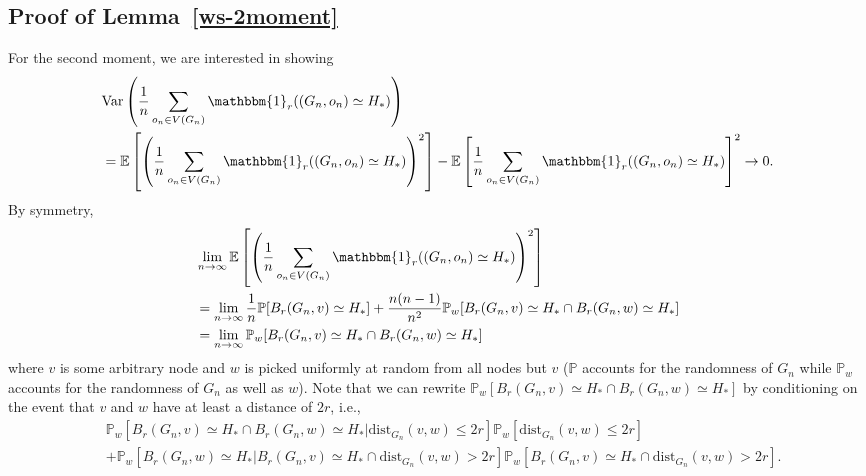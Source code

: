 \documentclass[10pt]{amsart}
\begin{document}
\subsection*{Proof of Lemma~\ref{ws-2moment}} \label{secondmoment} 

For the second moment, we are interested in showing
\begin{equation} \label{goal2}
\begin{split}
&\text{Var}\left(\frac{1}{n} \sum_{o_n\in V(G_n)}  \mathbbm{1}_r((G_n,o_n)\simeq H_* )  \right) \\ &=\mathbb{E}\left[\left(\frac{1}{n} \sum_{o_n\in V(G_n)}  \mathbbm{1}_r((G_n,o_n)\simeq H_* ) \right)^2 \right] - \mathbb{E}\left[\frac{1}{n} \sum_{o_n\in V(G_n)}  \mathbbm{1}_r((G_n,o_n)\simeq H_* )  \right]^2 \to 0.
\end{split}
\end{equation}
By symmetry,
\begin{equation} \label{eq-prob}
\begin{split}
   &\lim_{n \to \infty} \mathbb{E}\left[\left(\frac{1}{n} \sum_{o_n\in V(G_n)}  \mathbbm{1}_r((G_n,o_n)\simeq H_* ) \right)^2 \right] \\ &= \lim_{n \to \infty} \frac{1}{n} \mathbb{P}[B_r(G_n, v) \simeq H_*] + \frac{n(n-1)}{n^2} \mathbb{P}_w[B_r(G_n, v) \simeq H_* \cap B_r(G_n, w) \simeq H_*] \\
    &= \lim_{n \to \infty} \mathbb{P}_w[B_r(G_n, v) \simeq H_* \cap B_r(G_n, w) \simeq H_*]
\end{split}
\end{equation}
where $v$ is some arbitrary node and $w$ is picked uniformly at random from all nodes but $v$ ($\mathbb{P}$ accounts for the randomness of $G_n$ while $\mathbb{P}_w$ accounts for the randomness of $G_n$ as well as $w$). Note that we can rewrite $\mathbb{P}_w[B_r(G_n, v) \simeq H_* \cap B_r(G_n, w) \simeq H_*]$ by conditioning on the event that $v$ and $w$ have at least a distance of $2r$, i.e.,
\begin{equation}
\begin{split} \label{prob-partition}
    &\mathbb{P}_w[B_r(G_n, v) \simeq H_* \cap B_r(G_n, w) \simeq H_* | \text{dist}_{G_n}(v, w) \leq 2r] \mathbb{P}_w[\text{dist}_{G_n}(v, w) \leq 2r] \\
    &+ \mathbb{P}_w[ B_r(G_n, w) \simeq H_* | B_r(G_n, v) \simeq H_* \cap \text{dist}_{G_n}(v, w) > 2r] \mathbb{P}_w[B_r(G_n, v) \simeq H_* \cap \text{dist}_{G_n}(v, w) > 2r].
\end{split}
\end{equation} 
\end{document}
